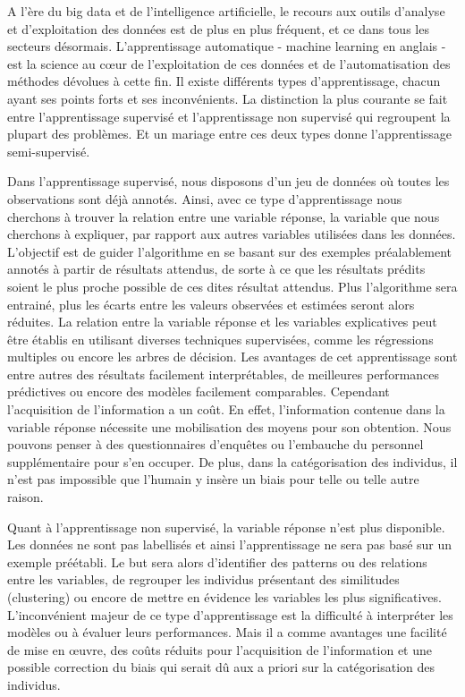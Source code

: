 \documentclass[12pt,a4paper]{book}
\newcommand{\1}{\mathds{1}}
\begin{document}
A l'ère du big data et de l'intelligence artificielle, le recours aux outils d'analyse et d'exploitation des données est de plus en plus fréquent, et ce dans tous les secteurs désormais. L'apprentissage automatique - machine learning en anglais - est la science au cœur de l'exploitation de ces données et de l'automatisation des méthodes dévolues à cette fin. Il existe différents types d'apprentissage, chacun ayant ses points forts et ses inconvénients. La distinction la plus courante se fait entre l'apprentissage supervisé et l'apprentissage non supervisé qui regroupent la plupart des problèmes. Et un mariage entre ces deux types donne l'apprentissage semi-supervisé. 

Dans l'apprentissage supervisé, nous disposons d'un jeu de données où toutes les observations sont déjà annotés.   Ainsi, avec ce type d'apprentissage nous cherchons à trouver la relation entre une variable réponse, la variable que nous cherchons à expliquer, par rapport aux autres variables utilisées dans les données. L'objectif est de guider l'algorithme en se basant sur des exemples préalablement annotés à partir de résultats attendus, de sorte à ce que les résultats prédits soient le plus proche possible de ces dites résultat attendus. Plus l'algorithme sera entrainé, plus les écarts entre les valeurs observées et estimées seront alors réduites. La relation entre la variable réponse et les variables explicatives peut être établis en utilisant diverses techniques supervisées, comme les régressions multiples ou encore les arbres de décision. Les avantages de cet apprentissage sont entre autres des résultats facilement interprétables, de meilleures performances prédictives ou encore des modèles facilement comparables. Cependant l'acquisition de l'information a un coût. En effet, l'information contenue dans la variable réponse nécessite une mobilisation des moyens pour son obtention. Nous pouvons penser à des questionnaires d'enquêtes ou l'embauche du personnel supplémentaire pour s'en occuper. De plus, dans la catégorisation des individus, il n'est pas impossible que l'humain y insère un biais pour telle ou telle autre raison.

Quant à l'apprentissage non supervisé, la variable réponse n'est plus disponible. Les données ne sont pas labellisés et ainsi l'apprentissage ne sera pas basé sur un exemple préétabli. Le but sera alors d'identifier des patterns ou des relations entre les variables, de regrouper les individus présentant des similitudes (clustering) ou encore de mettre en évidence les variables les plus significatives. L'inconvénient majeur de ce type d'apprentissage est la difficulté à interpréter les modèles ou à évaluer leurs performances.  Mais il a comme avantages une facilité de mise en œuvre, des coûts réduits pour l'acquisition de l'information et une possible correction du biais qui serait dû aux a priori sur la catégorisation des individus.
\end{document}
